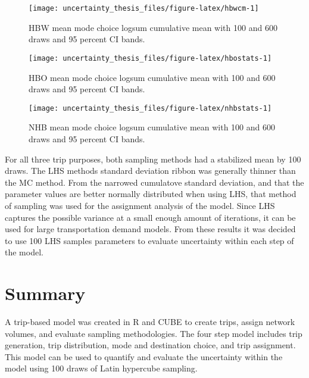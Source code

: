 \documentclass[fancy, masters,twoside]{byuthesis}
\begin{document}
\begin{figure}

{\centering \texttt{[image: uncertainty\_thesis\_files/figure-latex/hbwcm-1]} 

}

\caption{HBW mean mode choice logsum cumulative mean with 100 and 600 draws and 95 percent CI bands.}\label{fig:hbwcm}
\end{figure}

\begin{figure}

{\centering \texttt{[image: uncertainty\_thesis\_files/figure-latex/hbostats-1]} 

}

\caption{HBO mean mode choice logsum cumulative mean with 100 and 600 draws and 95 percent CI bands.}\label{fig:hbostats}
\end{figure}

\begin{figure}

{\centering \texttt{[image: uncertainty\_thesis\_files/figure-latex/nhbstats-1]} 

}

\caption{NHB mean mode choice logsum cumulative mean with 100 and 600 draws and 95 percent CI bands.}\label{fig:nhbstats}
\end{figure}

For all three trip purposes, both sampling methods had a stabilized mean by 100 draws. The LHS methods standard deviation ribbon was generally thinner than the MC method. From the narrowed cumulatove standard deviation, and that the parameter values are better normally distributed when using LHS, that method of sampling was used for the assignment analysis of the model. Since LHS captures the possible variance at a small enough amount of iterations, it can be used for large transportation demand models. From these results it was decided to use 100 LHS samples parameters to evaluate uncertainty within each step of the model.

\hypertarget{summary}{%
\section{Summary}\label{summary}}

A trip-based model was created in R and CUBE to create trips, assign network volumes, and evaluate sampling methodologies. The four step model includes trip generation, trip distribution, mode and destination choice, and trip assignment. This model can be used to quantify and evaluate the uncertainty within the model using 100 draws of Latin hypercube sampling.
\end{document}
